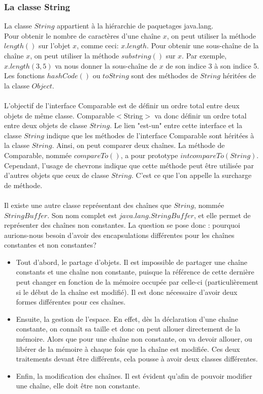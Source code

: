 \documentclass[a4paper,11pts]{article}
\begin{document}
\subsubsection{La classe String}
\indent La classe $String$ appartient à la hiérarchie de paquetages java.lang.\\
\indent Pour obtenir le nombre de caractères d'une chaîne $x$, on peut utiliser la méthode $length()$ sur l'objet $x$, comme ceci: $x.length$. Pour obtenir une sous-chaîne de la chaîne $x$, on peut utiliser la méthode $substring()$ sur $x$. Par exemple, $x.length(3,5)$ va nous donner la sous-chaîne de $x$ de son indice 3 à son indice 5.
\\
Les fonctions $hashCode()$ ou $toString$ sont des méthodes de $String$ héritées de la classe $Object$.
\\
\\
\indent L'objectif de l'interface Comparable est de définir un ordre total entre deux objets de même classe. Comparable$<$String$>$ va donc définir un ordre total entre deux objets de classe $String$. Le lien "est-un" entre cette interface et la classe $String$ indique que les méthodes de l'interface Comparable sont héritées à la classe $String$. Ainsi, on peut comparer deux chaînes. La méthode de Comparable, nommée $compareTo()$, a pour prototype $int compareTo (String)$. Cependant, l'usage de chevrons indique que cette méthode peut être utilisée par d'autres objets que ceux de classe $String$. C'est ce que l'on appelle la surcharge de méthode.
\\
\\
\indent Il existe une autre classe représentant des chaînes que $String$, nommée $StringBuffer$. Son nom complet est $java.lang.StringBuffer$, et elle permet de représenter des chaînes non constantes. La question se pose donc : pourquoi aurions-nous besoin d'avoir des encapsulations différentes pour les chaînes constantes et non constantes?
\begin{itemize}
\item Tout d'abord, le partage d'objets. Il est impossible de partager une chaîne constants et une chaîne non constante, puisque la référence de cette dernière peut changer en fonction de la mémoire occupée par celle-ci (particulièrement si le début de la chaîne est modifié). Il est donc nécessaire d'avoir deux formes différentes pour ces chaînes.
\item Ensuite, la gestion de l'espace. En effet, dès la déclaration d'une chaîne constante, on connaît sa taille et donc on peut allouer directement de la mémoire. Alors que pour une chaîne non constante, on va devoir allouer, ou libérer de la mémoire à chaque fois que la chaîne est modifiée. Ces deux traitements devant être différents, cela pousse à avoir deux classes différentes.
\item Enfin, la modification des chaînes. Il est évident qu'afin de pouvoir modifier une chaîne, elle doit être non constante.
\end{itemize}
\end{document}

